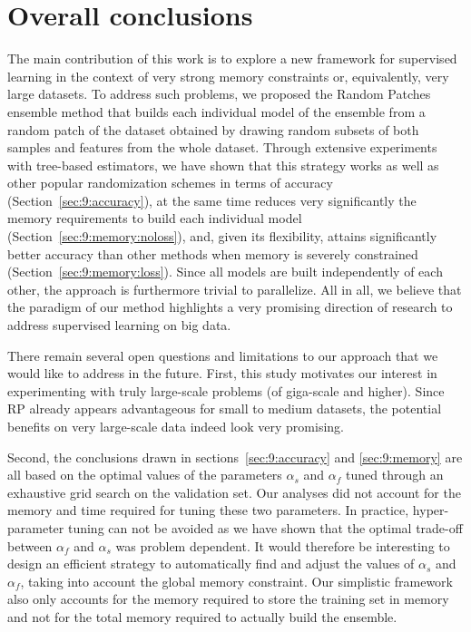\section{Overall conclusions}
\label{sec:9:conclusions}

The main contribution of this work is to explore a new framework for supervised
learning in the context of very strong memory constraints or, equivalently, very
large datasets. To address such problems, we proposed the Random Patches
ensemble method that builds each individual model of the ensemble from a random
patch of the dataset obtained by drawing random subsets of both samples and
features from the whole dataset. Through extensive experiments with tree-based
estimators, we have shown that this strategy works as well as other popular
randomization schemes in terms of accuracy (Section~\ref{sec:9:accuracy}), at the
same time reduces very significantly the memory requirements to build each
individual model (Section~\ref{sec:9:memory:noloss}), and, given its flexibility,
attains significantly better accuracy than other methods when memory is severely
constrained (Section~\ref{sec:9:memory:loss}). Since all models are built
independently of each other, the approach is furthermore trivial to parallelize.
All in all, we believe that the paradigm of our method highlights a very promising
direction of research to address supervised learning on big data.

There remain several open questions and limitations to our approach that we
would like to address in the future. First, this study motivates our interest in
experimenting with truly large-scale problems (of giga-scale and higher). Since
RP already appears advantageous for small to medium datasets, the potential benefits on
very large-scale data indeed look very promising.

Second, the conclusions drawn in sections~\ref{sec:9:accuracy} and
\ref{sec:9:memory} are all based on the optimal values of the parameters $\alpha_s$ and
$\alpha_f$ tuned through an exhaustive grid search on the validation set. Our
analyses did not account for the memory and time required for tuning these two
parameters. In practice, hyper-parameter tuning can not be avoided as we have
shown that the optimal trade-off between $\alpha_f$ and $\alpha_s$ was problem dependent.
It would therefore be interesting to design an efficient strategy to
automatically find and adjust the values of $\alpha_s$ and $\alpha_f$, taking into account
the global memory constraint. Our simplistic framework also only accounts for
the memory required to store the training set in memory and not for the total
memory required to actually build the ensemble.


